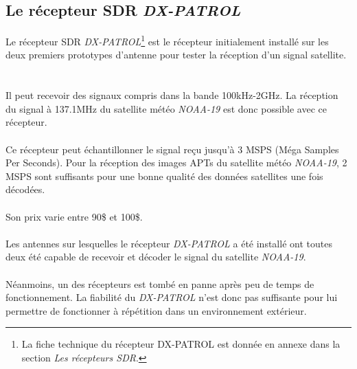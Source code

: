 \documentclass[12pt,fleqn]{book} %
\begin{document}
\subsection{Le récepteur SDR \emph{DX-PATROL}}
Le récepteur SDR \emph{DX-PATROL}\footnote{La fiche technique du récepteur DX-PATROL est donnée en annexe dans la section \emph{Les récepteurs SDR}.} est le récepteur initialement installé sur les deux premiers prototypes d'antenne pour tester la réception d'un signal satellite. 
~\\\\Il peut recevoir des signaux compris dans la bande 100kHz-2GHz. La réception du signal à 137.1MHz du satellite météo \emph{NOAA-19} est donc possible avec ce récepteur. 
~\\\\Ce récepteur peut échantillonner le signal reçu jusqu'à 3 MSPS (Méga Samples Per Seconds). Pour la réception des images APTs du satellite météo \emph{NOAA-19}, 2 MSPS sont suffisants pour une bonne qualité des données satellites une fois décodées.
~\\\\Son prix varie entre 90\$ et 100\$.
~\\\\Les antennes sur lesquelles le récepteur \emph{DX-PATROL} a été installé ont toutes deux été capable de recevoir et décoder le signal du satellite \emph{NOAA-19}.
~\\\\Néanmoins, un des récepteurs est tombé en panne après peu de temps de fonctionnement. La fiabilité du \emph{DX-PATROL} n'est donc pas suffisante pour lui permettre de fonctionner à répétition dans un environnement extérieur.
\end{document}
